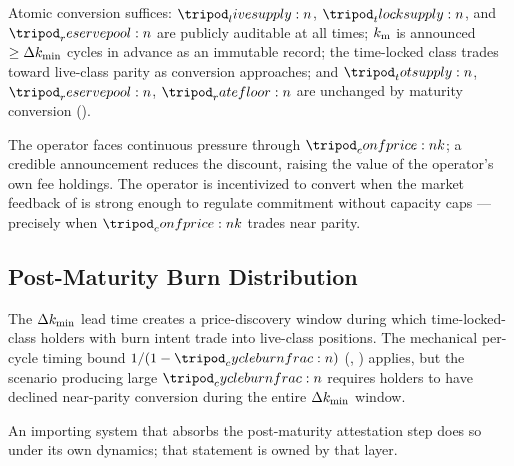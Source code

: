 \documentclass[../main.tex]{subfiles}
\begin{document}
\begin{remark}
    \label{rem:maturity:atomic-conversion}
    Atomic conversion suffices: $\livesupply{}$, $\tlocksupply{}$, and $\reservepool{}$ are
    publicly auditable at all times; $k\sb{\mathrm{m}}$ is announced $\geq \Delta k\sb{\min}$ cycles in
    advance as an immutable record; the time-locked class trades toward live-class parity as
    conversion approaches; and $\totsupply{}$, $\reservepool{}$, $\ratefloor{}$ are unchanged
    by maturity conversion ().
\end{remark}

\begin{remark}
    \label{rem:maturity:announcement-timing}
    The operator faces continuous pressure through $\confprice{k}$; a credible announcement
    reduces the discount, raising the value of the operator's own fee \tlockclass{}
    holdings. The operator is incentivized to convert when the market feedback of
     is strong enough to regulate commitment without capacity caps ---
    precisely when $\confprice{k}$ trades near parity.
\end{remark}

\subsection{Post-Maturity Burn Distribution}
\label{sec:maturity:burn-distribution}

\begin{proposition}
    \label{prop:maturity:burn-distribution}
    The $\Delta k\sb{\min}$ lead time creates a price-discovery window during which time-locked-class
    holders with burn intent trade into live-class positions. The mechanical per-cycle
    timing bound $1/(1-\cycleburnfrac{})$ (,
    ) applies, but the scenario producing large
    $\cycleburnfrac{}$ requires holders to have declined near-parity conversion during the
    entire $\Delta k\sb{\min}$ window.
\end{proposition}

An importing system that absorbs the post-maturity attestation step does so under its own
dynamics; that statement is owned by that layer.

\end{document}
